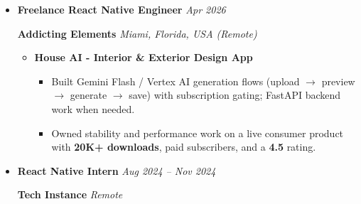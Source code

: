 \documentclass[a4paper,11pt]{article}
\begin{document}
\begin{itemize}[leftmargin=*]
\begin{itemize}[leftmargin=4mm]
\begin{itemize}[leftmargin=4mm]
\end{itemize}

\item \textbf{Picklebay - Pickleball Sports Platform}

\begin{itemize}[leftmargin=4mm]

\item Owned end-to-end delivery of a \textbf{WebToNative} app with custom JS bridges for native-like interactions.

\item Instrumented Firebase Analytics and Crashlytics for stability and funnel monitoring.

\end{itemize}

\end{itemize}

\vspace{1mm}

\item
\textbf{Freelance React Native Engineer}
\hfill
\textit{Apr 2026}

\textbf{Addicting Elements}
\hfill
\textit{Miami, Florida, USA (Remote)}

\begin{itemize}[leftmargin=4mm]

\item \textbf{House AI - Interior \& Exterior Design App}

\begin{itemize}[leftmargin=4mm]

\item Built Gemini Flash / Vertex AI generation flows (upload \(\rightarrow\) preview \(\rightarrow\) generate \(\rightarrow\) save) with subscription gating; FastAPI backend work when needed.

\item Owned stability and performance work on a live consumer product with \textbf{20K+ downloads}, paid subscribers, and a \textbf{4.5} rating.

\end{itemize}

\end{itemize}

\vspace{1mm}

\item
\textbf{React Native Intern}
\hfill
\textit{Aug 2024 -- Nov 2024}

\textbf{Tech Instance}
\hfill
\textit{Remote}


\end{itemize}
\end{document}
